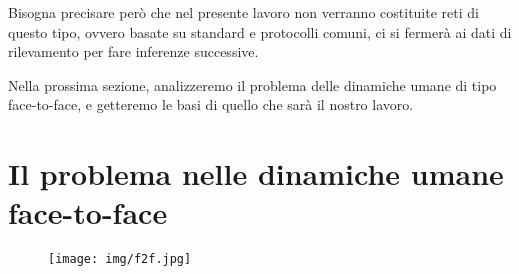 \documentclass[12pt,twoside]{report}
\begin{document}
    Bisogna precisare però che nel presente lavoro non verranno costituite reti di questo tipo, ovvero basate su standard e protocolli comuni, ci si fermerà ai dati di rilevamento per fare inferenze successive.
    
    Nella prossima sezione, analizzeremo il problema delle dinamiche umane di tipo face-to-face, e getteremo le basi di quello che sarà il nostro lavoro.
	\clearpage
	\section{Il problema nelle dinamiche umane face-to-face}
	
	
	 \begin{figure}[h]
    	\hfill\texttt{[image: img/f2f.jpg]}\hfill
    	\label{fig:Adj1}
    \end{figure}
	
\end{document}
